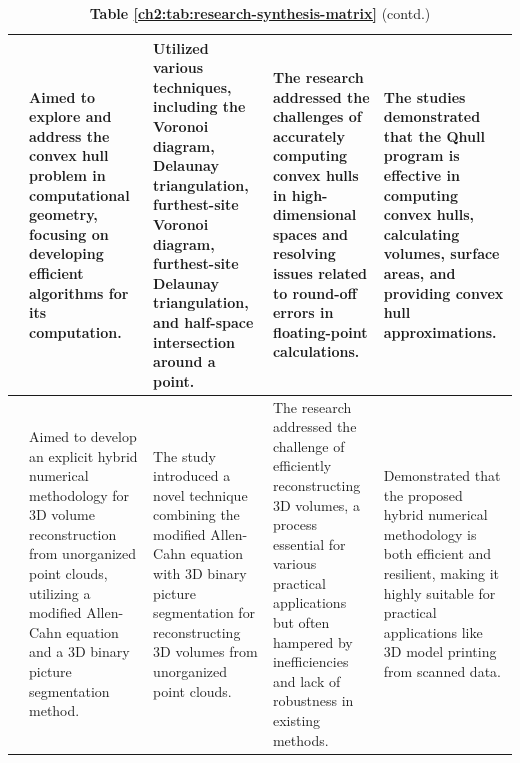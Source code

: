 \newpage

\begin{landscape}
	\begin{table}[ht]
		\begin{threeparttable}
			\caption*{\textbf{Table \ref{ch2:tab:research-synthesis-matrix}} (contd.)}
			\label{ch2:tab:research-synthesis-matrix-contd.}
			\begin{tabular}{p{2cm}  p{4.3cm} p{4.3cm} p{4.3cm} p{4.3cm}}
				\midrule
				\citet{kim2002}                                                                                                                                                                                                        &
				Aimed to explore and address the convex hull problem in computational geometry, focusing on developing efficient algorithms for its computation.                                                                       &
				Utilized various techniques, including the Voronoi diagram, Delaunay triangulation, furthest-site Voronoi diagram, furthest-site Delaunay triangulation, and half-space intersection around a point.                   &
				The research addressed the challenges of accurately computing convex hulls in high-dimensional spaces and resolving issues related to round-off errors in floating-point calculations.                                 &
				The studies demonstrated that the Qhull program is effective in computing convex hulls, calculating volumes, surface areas, and providing convex hull approximations.                                                    \\
				\midrule
				\citet{jeong2018}                                                                                                                                                                                                      &
				Aimed to develop an explicit hybrid numerical methodology for 3D volume reconstruction from unorganized point clouds, utilizing a modified Allen-Cahn equation and a 3D binary picture segmentation method.            &
				The study introduced a novel technique combining the modified Allen-Cahn equation with 3D binary picture segmentation for reconstructing 3D volumes from unorganized point clouds.                                     &
				The research addressed the challenge of efficiently reconstructing 3D volumes, a process essential for various practical applications but often hampered by inefficiencies and lack of robustness in existing methods. &
				Demonstrated that the proposed hybrid numerical methodology is both efficient and resilient, making it highly suitable for practical applications like 3D model printing from scanned data.                              \\
				\midrule
			\end{tabular}
		\end{threeparttable}
	\end{table}
\end{landscape}